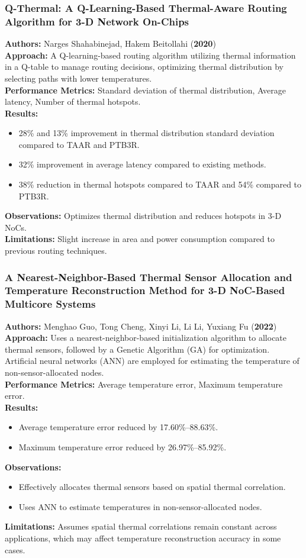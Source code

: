 \documentclass{beamer}
\begin{document}
\begin{frame}[fragile]
\frametitle{Q-Thermal: A Q-Learning-Based Thermal-Aware Routing Algorithm for 3-D Network On-Chips}

\textbf{Authors:} Narges Shahabinejad, Hakem Beitollahi (\textbf{2020}) \\
\textbf{Approach:} A Q-learning-based routing algorithm utilizing thermal information in a Q-table to manage routing decisions, optimizing thermal distribution by selecting paths with lower temperatures. \\
\textbf{Performance Metrics:} Standard deviation of thermal distribution, Average latency, Number of thermal hotspots. \\
\textbf{Results:} 
\begin{itemize}
    \item 28\% and 13\% improvement in thermal distribution standard deviation compared to TAAR and PTB3R.
    \item 32\% improvement in average latency compared to existing methods.
    \item 38\% reduction in thermal hotspots compared to TAAR and 54\% compared to PTB3R.
\end{itemize}
\textbf{Observations:} Optimizes thermal distribution and reduces hotspots in 3-D NoCs. \\
\textbf{Limitations:} Slight increase in area and power consumption compared to previous routing techniques.
\end{frame}

\begin{frame}[fragile]
\frametitle{A Nearest-Neighbor-Based Thermal Sensor Allocation and Temperature Reconstruction Method for 3-D NoC-Based Multicore Systems}

\small
\textbf{Authors:} Menghao Guo, Tong Cheng, Xinyi Li, Li Li, Yuxiang Fu (\textbf{2022}) \\
\textbf{Approach:} Uses a nearest-neighbor-based initialization algorithm to allocate thermal sensors, followed by a Genetic Algorithm (GA) for optimization. Artificial neural networks (ANN) are employed for estimating the temperature of non-sensor-allocated nodes. \\
\textbf{Performance Metrics:} Average temperature error, Maximum temperature error. \\
\textbf{Results:} 
\begin{itemize}
    \item Average temperature error reduced by 17.60\%–88.63\%.
    \item Maximum temperature error reduced by 26.97\%–85.92\%.
\end{itemize}
\textbf{Observations:} 
\begin{itemize}
    \item Effectively allocates thermal sensors based on spatial thermal correlation.
    \item Uses ANN to estimate temperatures in non-sensor-allocated nodes.
\end{itemize}
\textbf{Limitations:} Assumes spatial thermal correlations remain constant across applications, which may affect temperature reconstruction accuracy in some cases.
\end{frame}
\end{document}
